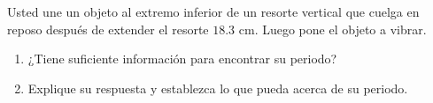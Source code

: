 \item Usted une un objeto al extremo inferior de un resorte vertical que cuelga en reposo después de extender el resorte $18.3\text{ cm}$. Luego pone el objeto a vibrar.
\begin{enumerate}
    \item ¿Tiene suficiente información para encontrar su periodo?
    \item Explique su respuesta y establezca lo que pueda acerca de su periodo.
\end{enumerate}